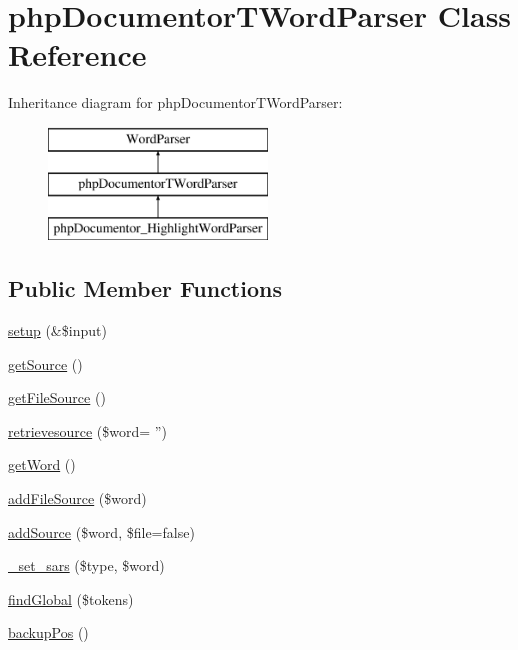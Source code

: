 \hypertarget{classphp_documentor_t_word_parser}{\section{php\-Documentor\-T\-Word\-Parser \-Class \-Reference}
\label{classphp_documentor_t_word_parser}
}
\-Inheritance diagram for php\-Documentor\-T\-Word\-Parser\-:\begin{figure}[H]
\begin{center}
\leavevmode
\includegraphics[height=3.000000cm]{classphp_documentor_t_word_parser}
\end{center}
\end{figure}
\subsection*{\-Public \-Member \-Functions}
\begin{DoxyCompactItemize}
\item 
\hyperlink{classphp_documentor_t_word_parser_a1545e049222168d79849355fe4343067}{setup} (\&\$input)
\item 
\hyperlink{classphp_documentor_t_word_parser_a42fdd8313c99d9c5f80219c1e192b93a}{get\-Source} ()
\item 
\hyperlink{classphp_documentor_t_word_parser_a298b6707b559119ded41803e00de3ed5}{get\-File\-Source} ()
\item 
\hyperlink{classphp_documentor_t_word_parser_a1a5cf13738ae1d5efdb026c476ea124d}{retrievesource} (\$word= '')
\item 
\hyperlink{classphp_documentor_t_word_parser_aed2fad5b3be15693fc9b44b7b73af497}{get\-Word} ()
\item 
\hyperlink{classphp_documentor_t_word_parser_a991c3e83a9ef6d92e7efc7127df98ed1}{add\-File\-Source} (\$word)
\item 
\hyperlink{classphp_documentor_t_word_parser_a2e41352ab476c3286ff2dd7520a16d2d}{add\-Source} (\$word, \$file=false)
\item 
\hyperlink{classphp_documentor_t_word_parser_a18a78da5fa38109cc900ec25b45c43a5}{\-\_\-set\-\_\-sars} (\$type, \$word)
\item 
\hyperlink{classphp_documentor_t_word_parser_aa2c00096ab132a5c7bcaeefc1d4c8b54}{find\-Global} (\$tokens)
\item 
\hyperlink{classphp_documentor_t_word_parser_ab70d58448f925de82211c5cf9e21cc05}{backup\-Pos} ()
\end{DoxyCompactItemize}
